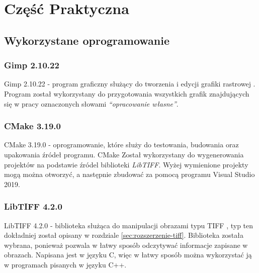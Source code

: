 \documentclass{article}
\begin{document}
    \section{Część Praktyczna}

        \subsection{Wykorzystane oprogramowanie}
        \subsubsection{Gimp 2.10.22}
        {
            \label{sec:gimp}
            \Large
            \justifying
            \quad
            Gimp 2.10.22 - program graficzny służący do tworzenia i edycji grafiki rastrowej \cite{Program GIMP}.
            Program został wykorzystany do przygotowania wszystkich grafik znajdujących się w pracy oznaczonych słowami \emph{``opracowanie własne''}.
        }

        \subsubsection{CMake 3.19.0}
        {
            \label{sec:cmake}
            \Large
            \justifying
            \quad
            CMake 3.19.0 - oprogramowanie, które służy do testowania, budowania oraz upakowania źródeł programu.
            CMake Został wykorzystany do wygenerowania projektów na podstawie źródel biblioteki \emph{LibTIFF}.
            Wyżej wymienione projekty mogą można otworzyć, a następnie zbudować za pomocą programu {Visual Studio 2019}.
        }

        \subsubsection{LibTIFF 4.2.0}
        {
            \label{sec:LibTIFF}
            \Large
            \justifying
            \quad
            LibTIFF 4.2.0 - biblioteka służąca do manipulacji obrazami typu TIFF \cite{Biblioteka LibTIFF}, typ ten dokładniej został opisany w rozdziale \ref{sec:rozszerzenie-tiff}.
            Biblioteka została wybrana, ponieważ pozwala w łatwy sposób odczytywać informacje zapisane w obrazach.
            Napisana jest w języku C, więc w łatwy sposób można wykorzystać ją w programach pisanych w języku C++.
        }
\end{document}
